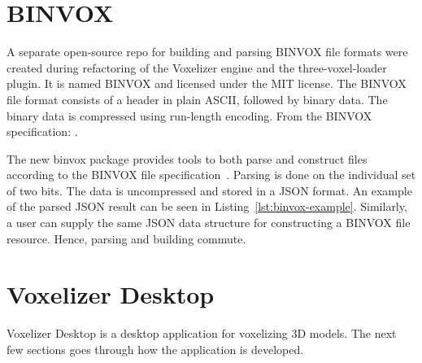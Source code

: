 \section{BINVOX}
\label{sec:method-binvox}
A separate open-source repo for building and parsing BINVOX file formats were created during refactoring of the Voxelizer engine and the three-voxel-loader plugin. It is named BINVOX and licensed under the MIT license. The BINVOX file format consists of a header in plain ASCII, followed by binary data. The binary data is compressed using run-length encoding. From the BINVOX specification: .

The new binvox package provides tools to both parse and construct files according to the BINVOX file specification~\cite{binvox-file-format}. Parsing is done on the individual set of two bits. The data is uncompressed and stored in a JSON format. An example of the parsed JSON result can be seen in Listing~\ref{lst:binvox-example}. Similarly, a user can supply the same JSON data structure for constructing a BINVOX file resource. Hence, parsing and building commute.
\clearpage


\section{Voxelizer Desktop}
Voxelizer Desktop is a desktop application for voxelizing 3D models. The next few sections goes through how the application is developed.

